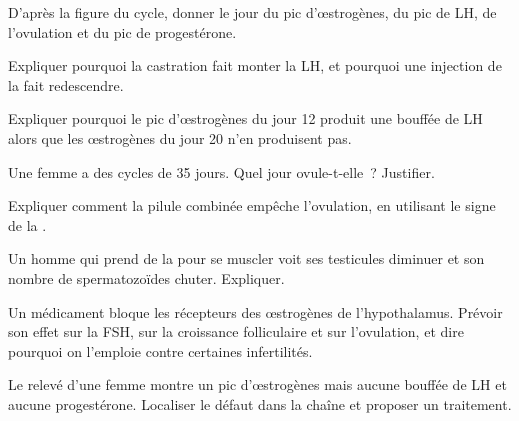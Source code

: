 \begin{exercise}[$\star\star$]\label{exo:g11:hormones-and-reproduction:6}
D'après la figure du cycle, donner le jour du pic d'œstrogènes, du pic
de LH, de l'ovulation et du pic de progestérone.
\end{exercise}

\begin{exercise}[$\star\star$]\label{exo:g11:hormones-and-reproduction:7}
Expliquer pourquoi la castration fait monter la LH, et pourquoi une
injection de  la fait redescendre.
\end{exercise}

\begin{exercise}[$\star\star$]\label{exo:g11:hormones-and-reproduction:8}
Expliquer pourquoi le pic d'œstrogènes du jour 12 produit une bouffée
de LH alors que les œstrogènes du jour 20 n'en produisent pas.
\end{exercise}

\begin{exercise}[$\star\star$]\label{exo:g11:hormones-and-reproduction:9}
Une femme a des cycles de 35 jours. Quel jour ovule-t-elle~?
Justifier.
\end{exercise}

\begin{exercise}[$\star\star$]\label{exo:g11:hormones-and-reproduction:10}
Expliquer comment la pilule combinée empêche l'ovulation, en utilisant
le signe de la .
\end{exercise}

\begin{exercise}[$\star\star$]\label{exo:g11:hormones-and-reproduction:11}
Un homme qui prend de la  pour se muscler voit ses
testicules diminuer et son nombre de spermatozoïdes chuter. Expliquer.
\end{exercise}

\begin{exercise}[$\star\star\star$]\label{exo:g11:hormones-and-reproduction:12}
Un médicament bloque les récepteurs des œstrogènes de l'hypothalamus.
Prévoir son effet sur la FSH, sur la croissance folliculaire et sur
l'ovulation, et dire pourquoi on l'emploie contre certaines
infertilités.
\end{exercise}

\begin{exercise}[$\star\star\star$]\label{exo:g11:hormones-and-reproduction:13}
Le relevé d'une femme montre un pic d'œstrogènes mais aucune bouffée de
LH et aucune progestérone. Localiser le défaut dans la chaîne et
proposer un traitement.
\end{exercise}

